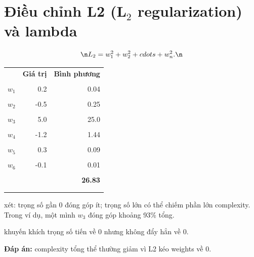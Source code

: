 \documentclass[12pt,a4paper]{article}
\begin{document}
\section{Điều chỉnh L2 (L\texorpdfstring{$_2$}{2} regularization) và lambda}

\begin{dinhnghia}[title={Công thức L2 regularization}]\n\[\n  L_2 = w_1^2 + w_2^2 + \\cdots + w_n^2.\n\]\n\end{dinhnghia}

\begin{vidu}[title={Ví dụ tính L2 với 6 trọng số}]\n\begin{center}\n\small\n\begin{tabular}{@{}lrr@{}}\n\toprule\n & \textbf{Giá trị} & \textbf{Bình phương} \\\\\n\midrule\n$w_1$ & 0.2 & 0.04 \\\\\n$w_2$ & -0.5 & 0.25 \\\\\n$w_3$ & 5.0 & 25.0 \\\\\n$w_4$ & -1.2 & 1.44 \\\\\n$w_5$ & 0.3 & 0.09 \\\\\n$w_6$ & -0.1 & 0.01 \\\\\n\midrule\n &  & \textbf{26.83} \\\\\n\bottomrule\n\end{tabular}\n\end{center} xét: trọng số gần 0 đóng góp ít; trọng số lớn có thể chiếm phần lớn complexity. Trong ví dụ, một mình $w_3$ đóng góp khoảng 93\% tổng.\n\end{vidu}

\begin{luuy} khuyến khích trọng số tiến về 0 nhưng không đẩy hẳn về 0.\n\end{luuy}

\begin{luuy}[title={Bài tập: dùng L2 thì complexity thay đổi thế nào?}]\n\textbf{Đáp án:} complexity tổng thể thường giảm vì L2 kéo weights về 0.\n\end{luuy}
\end{document}
